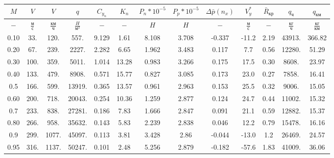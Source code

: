 \begin{tabular}{|c|c|c|c|c|c|c|c|c|c|c|c|c|}
\hline
$M$ & $V$ & $V$ & $q$ & $C_{y_n}$ & $K_n$ & $P_n*10^{-5}$ & $P_p*10^{-5}$ & $\Delta \bar{p}(n_x)$ & $V_y^*$ & $\bar{R}_{кр}$ & $q_{ч}$ & $q_{км}$ \\ 
\hline
$-$ & $\frac{м}{с}$ & $\frac{км}{ч}$ & $\frac{H}{м^2}$ & $-$ & $-$ & $H$ & $H$ & $-$ & $\frac{м}{с}$ & $-$ & $\frac{кг}{ч}$ & $\frac{кг}{км}$ \\ 
\hline
0.10 & 33. & 120. & 557. & 9.129 & 1.61 & 8.108 & 3.708 & -0.337 & -11.2 & 2.19 & 43913. & 366.82 \\ 
\hline
0.20 & 67. & 239. & 2227. & 2.282 & 6.65 & 1.962 & 3.483 & 0.117 & 7.7 & 0.56 & 12280. & 51.29 \\ 
\hline
0.30 & 100. & 359. & 5011. & 1.014 & 13.28 & 0.983 & 3.266 & 0.175 & 17.5 & 0.30 & 8608. & 23.97 \\ 
\hline
0.40 & 133. & 479. & 8908. & 0.571 & 15.77 & 0.827 & 3.085 & 0.173 & 23.0 & 0.27 & 7858. & 16.41 \\ 
\hline
0.5 & 166. & 599. & 13919. & 0.365 & 13.57 & 0.961 & 2.963 & 0.153 & 25.5 & 0.32 & 9006. & 15.05 \\ 
\hline
0.60 & 200. & 718. & 20043. & 0.254 & 10.36 & 1.259 & 2.877 & 0.124 & 24.7 & 0.44 & 11002. & 15.32 \\ 
\hline
0.7 & 233. & 838. & 27281. & 0.186 & 7.83 & 1.666 & 2.847 & 0.091 & 21.1 & 0.59 & 12882. & 15.37 \\ 
\hline
0.80 & 266. & 958. & 35632. & 0.143 & 5.83 & 2.239 & 2.838 & 0.046 & 12.2 & 0.79 & 15478. & 16.16 \\ 
\hline
0.9 & 299. & 1077. & 45097. & 0.113 & 3.81 & 3.428 & 2.86 & -0.044 & -13.0 & 1.2 & 26469. & 24.57 \\ 
\hline
0.95 & 316. & 1137. & 50247. & 0.101 & 2.48 & 5.256 & 2.879 & -0.182 & -57.6 & 1.83 & 41009. & 36.06 \\ 
\hline
\end{tabular}